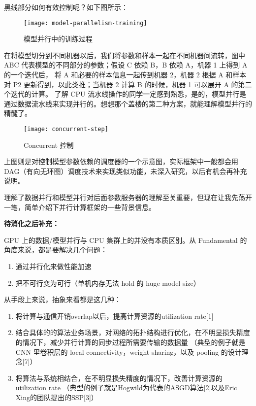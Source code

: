 黑线部分如何有效控制呢？如下图所示：

\begin{figure}[hbtp]
\centering
\texttt{[image: model-parallelism-training]}
\caption{模型并行中的训练过程}
\end{figure}

在将模型切分到不同机器以后，我们将参数和样本一起在不同机器间流转，图中 ABC 代表模型的不同部分的参数；假设 C 依赖 B，B 依赖 A，机器 1 上得到 A 的一个迭代后，
将 A 和必要的样本信息一起传到机器 2，机器 2 根据 A 和样本对 P2 更新得到，以此类推；当机器 2 计算 B 的时候，机器 1 可以展开 A 的第二个迭代的计算。
了解 CPU 流水线操作的同学一定感到熟悉，是的，模型并行是通过数据流水线来实现并行的。想想那个盖楼的第二种方案，就能理解模型并行的精髓了。

\begin{figure}[hbtp]
\centering
\texttt{[image: concurrent-step]}
\caption{Concurrent 控制}
\end{figure}

上图则是对控制模型参数依赖的调度器的一个示意图，实际框架中一般都会用 DAG（有向无环图）调度技术来实现类似功能，未深入研究，以后有机会再补充说明。

理解了数据并行和模型并行对后面参数服务器的理解至关重要，但现在让我先荡开一笔，简单介绍下并行计算框架的一些背景信息。

\noindent\textbf{待消化之后补充：}

GPU 上的数据/模型并行与 CPU 集群上的并没有本质区别。从 Fundamental 的角度来说，都是要解决几个问题：
\begin{enumerate}
  \item 通过并行化来做性能加速
  \item 把不可行变为可行（单机内存无法 hold 的 huge model size）
\end{enumerate}

从手段上来说，抽象来看都是这几种：
\begin{enumerate}
  \item 将计算与通信开销overlap以后，提高计算资源的utilization rate[1]
  \item 结合具体的的算法业务场景，对网络的拓扑结构进行优化，在不明显损失精度的情况下，减少并行计算的同步过程所需要传输的数据量
  （典型的例子就是 CNN 里卷积层的 local connectivity，weight sharing，以及 pooling 的设计理念[7]）
  \item 将算法与系统相结合，在不明显损失精度的情况下，改善计算资源的utilization rate
  （典型的例子就是Hogwild为代表的ASGD算法[2]以及Eric Xing的团队提出的SSP[3]）
\end{enumerate}

